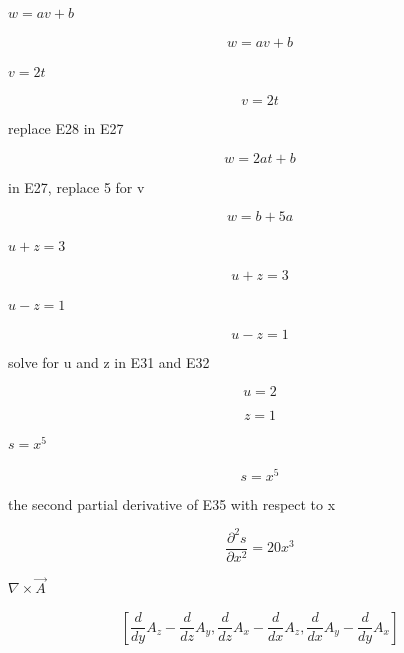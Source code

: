 \documentclass[dvipdfmx]{article}
\begin{document}
$w = a v + b$

\begin{equation}
  w = a v + b
  \label{eq:E27}
\end{equation}

$v = 2 t$

\begin{equation}
  v = 2 t
  \label{eq:E28}
\end{equation}

replace E28 in E27

\begin{equation}
  w = 2 a t+b
  \label{eq:E29}
\end{equation}

in E27, replace 5 for v

\begin{equation}
  w = b+5 a
  \label{eq:E30}
\end{equation}

$u + z = 3$

\begin{equation}
  u + z = 3
  \label{eq:E31}
\end{equation}

$u - z = 1$

\begin{equation}
  u - z = 1
  \label{eq:E32}
\end{equation}

solve for u and z in E31 and E32

\begin{equation}
  u = 2
  \label{eq:E33}
\end{equation}

\begin{equation}
  z = 1
  \label{eq:E34}
\end{equation}

$s = x^5$

\begin{equation}
  s = x^5
  \label{eq:E35}
\end{equation}

the second partial derivative of E35 with respect to x

\begin{equation}
  \frac{\partial^{2} s}{\partial x^{2}} = 20 x^3
  \label{eq:E36}
\end{equation}

$\nabla \times \vec{A}$

\begin{equation}
  \left[ \frac{d}{d y} A_{z}-\frac{d}{d z} A_{y} , \frac{d}{d z} A_{x}-\frac{d}{d x} A_{z} , \frac{d}{d x} A_{y}-\frac{d}{d y} A_{x} \right]
  \label{eq:E37}
\end{equation}
\end{document}
